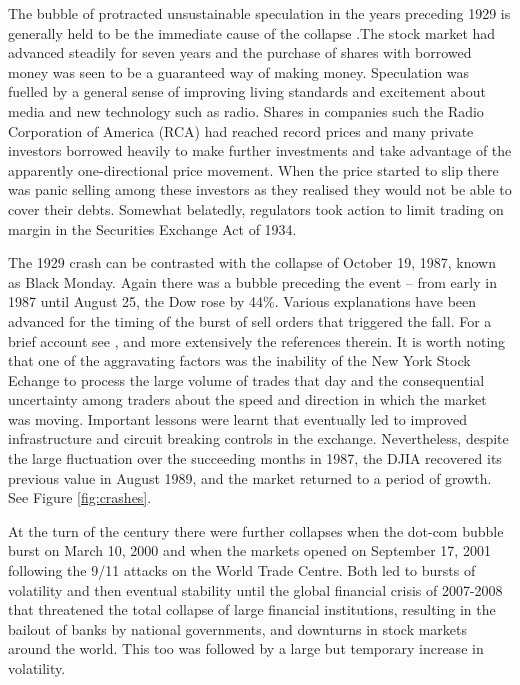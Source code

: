 The bubble of protracted unsustainable speculation in the years preceding 1929 is generally held to be the immediate cause of the collapse .The stock market had advanced steadily for seven years and the purchase of shares with borrowed money was seen to be a guaranteed way of making money. Speculation was fuelled by a general sense of improving living standards and excitement about media and new technology such as radio. Shares in companies such the Radio Corporation of America (RCA) had reached record prices and many private investors borrowed heavily to make further investments and take advantage of the apparently one-directional price movement. When the price started to slip there was panic selling among these investors as they realised they would not be able to cover their debts. Somewhat belatedly, regulators took action to limit trading on margin in the Securities Exchange Act of 1934.    

The 1929 crash can be contrasted with the collapse of October 19, 1987, known as Black Monday.  Again there was a bubble preceding the event -- from early in 1987 until August 25, the Dow rose by 44\%. Various explanations have been advanced for the timing of the burst of sell orders that triggered the fall. For a brief account see  , and more extensively the references therein.  It is worth noting that one of the aggravating factors was the inability of the New York Stock Echange to process the large volume of trades that day and the consequential uncertainty among traders about the speed and direction in which the market was moving. Important lessons were learnt that eventually led to improved infrastructure and circuit breaking controls in the exchange. Nevertheless, despite the large fluctuation over the succeeding months in 1987, the DJIA recovered its previous value in August 1989, and  the market returned to a period of growth.  See Figure \ref{fig:crashes}.

At the turn of the century there were further collapses when the dot-com bubble burst on March 10, 2000 and when the markets opened on September  17, 2001 following the  9/11 attacks on the World Trade Centre. Both led to bursts of volatility and then eventual stability until the global financial crisis of 2007-2008 that threatened the total collapse of large financial institutions, resulting in the bailout of banks by national governments, and downturns in stock markets around the world. This too was followed by a large but temporary increase in volatility. 

